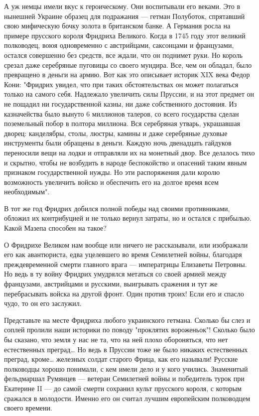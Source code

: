 А уж немцы имели вкус к героическому. Они воспитывали его веками. Это в
нынешней Украине образец для подражания --- гетман Полуботок, спрятавший свою
мифическую бочку золота в британском банке. А Германия росла на примере
прусского короля Фридриха Великого. Когда в 1745 году этот великий полководец,
воюя одновременно с австрийцами, саксонцами и французами, остался совершенно
без средств, все ждали, что он поднимет руки. Но король срезал даже серебряные
пуговицы со своего мундира. Все, чем он обладал, было превращено в деньги на
армию. Вот как это описывает историк XIX века Федор Кони: "Фридрих увидел, что
при таких обстоятельствах он может полагаться только на самого себя. Надлежало
увеличить силы Пруссии, и на этот предмет он не пощадил ни государственной
казны, ни даже собственного достояния. Из казначейства было вынуто 6 миллионов
талеров, со всего государства сделан поземельный побор в полтора миллиона. Вся
серебряная утварь, украшавшая дворец: канделябры, столы, люстры, камины и даже
серебряные духовые инструменты были обращены в деньги. Каждую ночь двенадцать
гайдуков переносили вещи на лодки и отправляли их на монетный двор. Все
делалось тихо и скрытно, чтобы не возбудить в народе беспокойство и опасений
таким явным признаком государственной нужды. Но эти распоряжения дали королю
возможность увеличить войско и обеспечить его на долгое время всем
необходимым".

В тот же год Фридрих добился полной победы над своими противниками, обложил их
контрибуцией и не только вернул затраты, но и остался с прибылью. Какой Мазепа
способен на такое?

О Фридрихе Великом нам вообще или ничего не рассказывали, или изображали его
как авантюриста, едва уцелевшего во время Семилетней войны, благодаря
преждевременной смерти главного врага --- императрицы Елизаветы Петровны. Но ведь
в ту войну Фридрих умудрялся метаться со своей армией между французами,
австрийцами и русскими, выигрывать сражения и тут же перебрасывать войска на
другой фронт. Один против троих! Если его и спасло чудо, то он его заслужил.

Представьте на месте Фридриха любого украинского гетмана. Сколько бы слез и
соплей пролили наши историки по поводу "проклятих вороженьок"! Сколько было бы
сказано, что земля у нас не та, что на ней плохо обороняться, что нет
естественных преград… Но ведь в Пруссии тоже не было никаких естественных
преград, кроме… железных солдат старого Фрица, как его называли! Русские
полководцы хорошо понимали, с кем имели дело и у кого учились. Знаменитый
фельдмаршал Румянцев --- ветеран Семилетней войны и победитель турок при
Екатерине II --- до самой смерти сохранил культ прусского короля, с которым
сражался в молодости. Именно его он считал лучшим европейским полководцем
своего времени.

